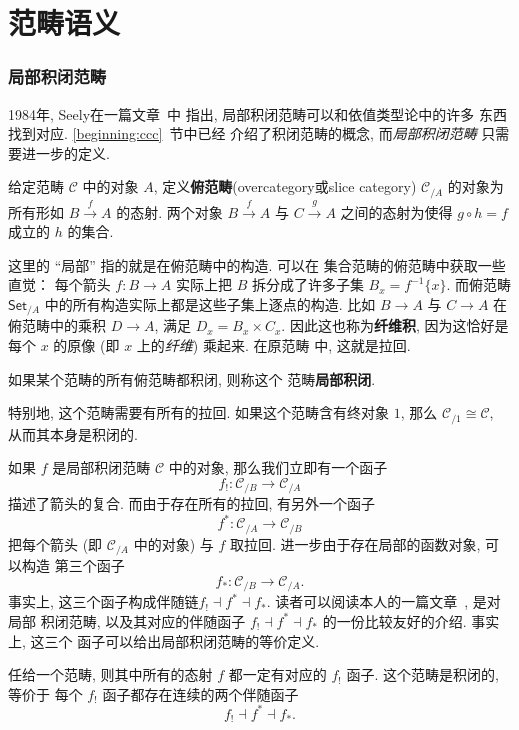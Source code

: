 \chapter{范畴语义}
\subsection{局部积闭范畴}

1984年, Seely在一篇文章~\cite{seely:1984:lccc}中
指出, 局部积闭范畴可以和依值类型论中的许多
东西找到对应. \ref{beginning:ccc}~节中已经
介绍了积闭范畴的概念, 而\emph{局部积闭范畴}
只需要进一步的定义.
\begin{definition}
给定范畴 \(\mathcal C\) 中的对象 \(A\),
定义\textbf{俯范畴}(overcategory或slice category)
\(\mathcal C_{/A}\) 的对象为所有形如
\(B \xrightarrow{f} A\) 的态射. 两个对象
\(B \xrightarrow f A\) 与 \(C \xrightarrow g A\)
之间的态射为使得 \(g \circ h = f\) 成立的 \(h\) 的集合.
\end{definition}
这里的 “局部” 指的就是在俯范畴中的构造. 可以在
集合范畴的俯范畴中获取一些直觉： 每个箭头
\(f : B \to A\) 实际上把 \(B\) 拆分成了许多子集
\(B_x = f^{-1}\{x\}\). 而俯范畴 \(\textsf{Set}_{/A}\)
中的所有构造实际上都是这些子集上逐点的构造. 比如
\(B \to A\) 与 \(C \to A\) 在俯范畴中的乘积
\(D \to A\), 满足 \(D_x = B_x \times C_x\).
因此这也称为\textbf{纤维积}, 因为这恰好是每个 \(x\)
的原像 (即 \(x\) 上的\emph{纤维}) 乘起来. 在原范畴
中, 这就是拉回.
\begin{definition}
如果某个范畴的所有俯范畴都积闭, 则称这个
范畴\textbf{局部积闭}.
\end{definition}
特别地, 这个范畴需要有所有的拉回. 如果这个范畴含有终对象
\(1\), 那么 \(\mathcal C_{/1} \cong \mathcal C\),
从而其本身是积闭的.

如果 \(f\) 是局部积闭范畴 \(\mathcal C\)
中的对象, 那么我们立即有一个函子
\[f_! : \mathcal C_{/B} \to \mathcal C_{/A}\]
描述了箭头的复合. 而由于存在所有的拉回, 有另外一个函子
\[f^* : \mathcal C_{/A} \to \mathcal C_{/B}\]
把每个箭头 (即 \(\mathcal C_{/A}\) 中的对象) 与
\(f\) 取拉回. 进一步由于存在局部的函数对象, 可以构造
第三个函子
\[f_* : \mathcal C_{/B} \to \mathcal C_{/A}.\]
事实上, 这三个函子构成伴随链\(f_!\dashv f^*\dashv f_*\).
读者可以阅读本人的一篇文章~\cite{me:2022:lccc}, 是对局部
积闭范畴, 以及其对应的伴随函子 \(f_!\dashv
f^*\dashv f_*\) 的一份比较友好的介绍. 事实上, 这三个
函子可以给出局部积闭范畴的等价定义.
\begin{theorem}
任给一个范畴, 则其中所有的态射 \(f\) 都一定有对应的
\(f_!\) 函子. 这个范畴是积闭的, 等价于
每个 \(f_!\) 函子都存在连续的两个伴随函子
\[f_!\dashv f^*\dashv f_*.\]
\end{theorem}

